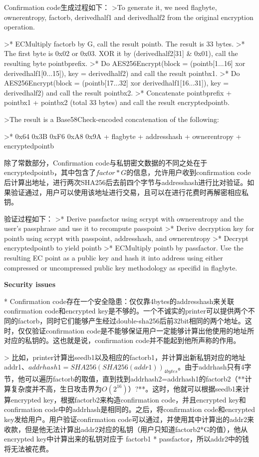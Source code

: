 \documentclass{article}
\begin{document}
Confirmation code生成过程如下：
>To generate it, we need flagbyte, ownerentropy, factorb, derivedhalf1 and derivedhalf2 from the original encryption operation.

>* ECMultiply factorb by G, call the result pointb. The result is 33 bytes.
>* The first byte is 0x02 or 0x03. XOR it by (derivedhalf2[31] \& 0x01), call the resulting byte pointbprefix.
>* Do AES256Encrypt(block = (pointb[1...16] xor derivedhalf1[0...15]), key = derivedhalf2) and call the result pointbx1.
>* Do AES256Encrypt(block = (pointb[17...32] xor derivedhalf1[16...31]), key = derivedhalf2) and call the result pointbx2.
>* Concatenate pointbprefix + pointbx1 + pointbx2 (total 33 bytes) and call the result encryptedpointb.  

>The result is a Base58Check-encoded concatenation of the following:  

>* 0x64 0x3B 0xF6 0xA8 0x9A + flagbyte + addresshash + ownerentropy + encryptedpointb

除了常数部分，Confirmation code与私钥密文数据的不同之处在于encryptedpointb，其中包含了$factor*G$的信息，允许用户收到confirmation code后计算出地址，进行两次SHA256后去前四个字节与addresshash进行比对验证。如果验证通过，用户可以使用该地址进行交易，且可以在进行花费时再解密相应私钥。

验证过程如下：
>* Derive passfactor using scrypt with ownerentropy and the user's passphrase and use it to recompute passpoint
>* Derive decryption key for pointb using scrypt with passpoint, addresshash, and ownerentropy
>* Decrypt encryptedpointb to yield pointb
>* ECMultiply pointb by passfactor. Use the resulting EC point as a public key and hash it into address using either compressed or 
uncompressed public key methodology as specifid in flagbyte.

\textbf{ Security issues}

* Confirmation code存在一个安全隐患：仅仅靠4bytes的addresshash来关联confirmation code和encrypted key是不够的。一个不诚实的printer可以提供两个不同的factorb，同时它们能够产生经过double-sha256后前32bit相同的两个地址。这时，仅仅验证confirmation code是不能够保证用户一定能够计算出他使用的地址所对应的私钥的。这也就是说，confirmation code并不能起到他所声称的作用。

> 比如，printer计算出seedb1以及相应的factorb1，并计算出新私钥对应的地址addr1、$addrhash1=SHA256(SHA256(addr1))_{4bytes}$。由于addrhash只有4字节，他可以遍历factorb的取值，直到找到addrhash2=addrhash1的factorb2（**计算复杂度并不高，生日攻击界为$O(2^{16})$）?**。这时，他就可以根据seedb1来计算encrypted key，根据factorb2来构造confirmation code，并且encrypted key和confirmation code中的addrhash是相同的。之后，将confirmation code和encrypted key发给用户。用户验证confirmation code可以通过，并使用其中计算出的addr2来收款，但是他无法计算出addr2对应的私钥（用户只知道factorb2*G的值），他从encrypted key中计算出来的私钥对应于 factorb1 * passfactor，所以addr2中的钱将无法被花费。
\end{document}
